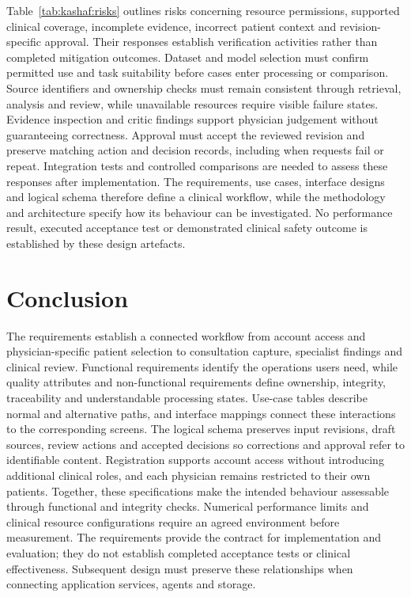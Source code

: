 Table~\ref{tab:kashaf:risks} outlines risks concerning resource permissions, supported clinical coverage, incomplete evidence, incorrect patient context and revision-specific approval. Their responses establish verification activities rather than completed mitigation outcomes. Dataset and model selection must confirm permitted use and task suitability before cases enter processing or comparison. Source identifiers and ownership checks must remain consistent through retrieval, analysis and review, while unavailable resources require visible failure states. Evidence inspection and critic findings support physician judgement without guaranteeing correctness. Approval must accept the reviewed revision and preserve matching action and decision records, including when requests fail or repeat. Integration tests and controlled comparisons are needed to assess these responses after implementation. The requirements, use cases, interface designs and logical schema therefore define a clinical workflow, while the methodology and architecture specify how its behaviour can be investigated. No performance result, executed acceptance test or demonstrated clinical safety outcome is established by these design artefacts.

\section{Conclusion}

The requirements establish a connected workflow from account access and physician-specific patient selection to consultation capture, specialist findings and clinical review. Functional requirements identify the operations users need, while quality attributes and non-functional requirements define ownership, integrity, traceability and understandable processing states. Use-case tables describe normal and alternative paths, and interface mappings connect these interactions to the corresponding screens. The logical schema preserves input revisions, draft sources, review actions and accepted decisions so corrections and approval refer to identifiable content. Registration supports account access without introducing additional clinical roles, and each physician remains restricted to their own patients. Together, these specifications make the intended behaviour assessable through functional and integrity checks. Numerical performance limits and clinical resource configurations require an agreed environment before measurement. The requirements provide the contract for implementation and evaluation; they do not establish completed acceptance tests or clinical effectiveness. Subsequent design must preserve these relationships when connecting application services, agents and storage.

\endgroup

